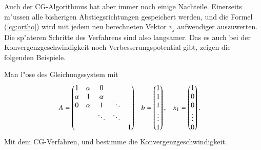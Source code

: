 Auch der CG-Algorithmus hat aber immer noch einige Nachteile.
Einerseits m"ussen alle bisherigen
Abstiegsrichtungen gespeichert werden, und die Formel (\ref{cg:ortho}) wird
mit jedem neu berechneten Vektor $v_j$ aufwendiger auszuwerten.
Die sp"ateren Schritte des Verfahrens sind also langsamer.
Das es auch bei der Konvergenzgeschwindigkeit noch Verbesserungspotential
gibt, zeigen die folgenden Beispiele.

\begin{beispiel}
Man l"ose des Gleichungssystem mit 
\begin{align*}
A&=\begin{pmatrix}
     1&\alpha&     0&      &      \\
\alpha&     1&\alpha&      &      \\
     0&\alpha&     1&\smash{\ddots}&      \\
      &      &\ddots&\ddots&      \\
      &      &      &      &     1
\end{pmatrix}
&
b&=\begin{pmatrix}1\\1\\1\\\vdots\\1\end{pmatrix},
&
x_1&=\begin{pmatrix}1\\0\\0\\\vdots\\0\end{pmatrix}.
\end{align*}
Mit dem CG-Verfahren, und bestimme die Konvergenzgeschwindigkeit.


\end{beispiel}
